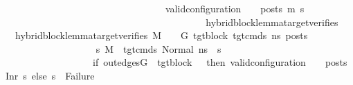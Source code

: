 \begin{isabellebody}
\ \ \ \ \ \ \ \ \ \ \ \ \ \ \ \ \ \ \ \ \ \ \ \ \ \ \ \ \ \ \ \ \ \ valid{\isacharunderscore}{\kern0pt}configuration\ {\isasymLambda}\ {\isasymGamma}\ {\isasymOmega}\ posts\ m{}{\isacharprime}{\kern0pt}\ s{}{\isacharprime}{\kern0pt}{\isacharparenright}{\kern0pt}\isanewline
\ \ \ \ \ \ \ \ \ \ \ \ \ \ \ \ \ \ \ \ \ {\isacharparenright}{\kern0pt}\isanewline
\ \ \ \ \ \ \ \ \ \ \ \ \ \ \ \ \ \ \ {\isacharparenright}{\kern0pt}{\isachardoublequoteclose}\isanewline
\isanewline
{}\isamarkupfalse%
\ hybrid{\isacharunderscore}{\kern0pt}block{\isacharunderscore}{\kern0pt}lemma{\isacharunderscore}{\kern0pt}target{\isacharunderscore}{\kern0pt}verifies\isanewline
\ \ \ {\isachardoublequoteopen}hybrid{\isacharunderscore}{\kern0pt}block{\isacharunderscore}{\kern0pt}lemma{\isacharunderscore}{\kern0pt}target{\isacharunderscore}{\kern0pt}verifies\ M\ {\isasymLambda}\ {\isasymGamma}\ {\isasymOmega}\ G{\isacharprime}{\kern0pt}\ tgt{\isacharunderscore}{\kern0pt}block\ tgt{\isacharunderscore}{\kern0pt}cmds\ ns\ posts\ {\isasymequiv}\ \ \ \ \ \ \ \ \ \ \ \ \ \ \isanewline
\ \ \ \ \ \ \ \ \ \ \ \ {\isacharparenleft}{\kern0pt}{\isasymforall}s{}{\isacharprime}{\kern0pt}{\isachardot}{\kern0pt}\ {\isacharparenleft}{\kern0pt}M{\isacharcomma}{\kern0pt}{\isasymLambda}{\isacharcomma}{\kern0pt}{\isasymGamma}{\isacharcomma}{\kern0pt}{\isasymOmega}\ {\isasymturnstile}\ {\isasymlangle}tgt{\isacharunderscore}{\kern0pt}cmds{\isacharcomma}{\kern0pt}\ Normal\ ns{\isasymrangle}\ {\isacharbrackleft}{\kern0pt}{\isasymrightarrow}{\isacharbrackright}{\kern0pt}\ s{}{\isacharprime}{\kern0pt}{\isacharparenright}{\kern0pt}\ {\isasymlongrightarrow}\ \ %
\isanewline
\ \ \ \ \ \ \ \ \ \ \ \ \ \ \ \ \ \ \ {\isacharparenleft}{\kern0pt}if\ {\isacharparenleft}{\kern0pt}out{\isacharunderscore}{\kern0pt}edges{\isacharparenleft}{\kern0pt}G{\isacharprime}{\kern0pt}{\isacharparenright}{\kern0pt}\ {\isacharbang}{\kern0pt}\ tgt{\isacharunderscore}{\kern0pt}block\ {\isacharequal}{\kern0pt}\ {\isacharbrackleft}{\kern0pt}{\isacharbrackright}{\kern0pt}{\isacharparenright}{\kern0pt}\ then\ valid{\isacharunderscore}{\kern0pt}configuration\ {\isasymLambda}\ {\isasymGamma}\ {\isasymOmega}\ posts\ {\isacharparenleft}{\kern0pt}Inr{\isacharparenleft}{\kern0pt}{\isacharparenright}{\kern0pt}{\isacharparenright}{\kern0pt}\ s{}{\isacharprime}{\kern0pt}\ else\ s{}{\isacharprime}{\kern0pt}\ {\isasymnoteq}\ Failure{\isacharparenright}{\kern0pt}\ {\isasymand}\ \isanewline

\end{isabellebody}
